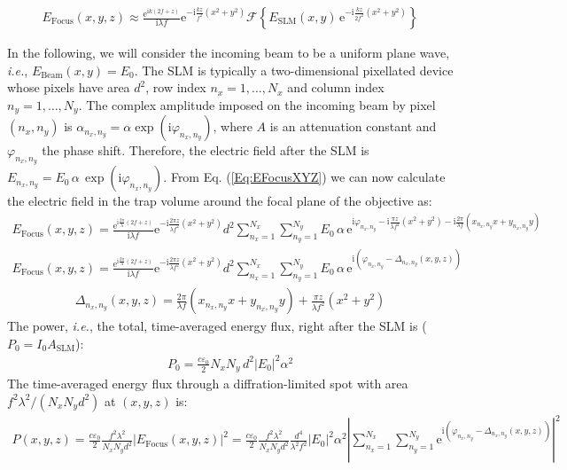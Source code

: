 \documentclass[a4paper,11pt,onecolumn]{scrartcl}
\renewcommand{\i}{\mathrm i}
\newcommand{\e}{\mathrm e}
\begin{document}
\begin{align}
\boxed{
E_\mathrm{Focus}(x,y,z) \approx \frac{\mathrm e^{\i k(2f + z)}}{\i\lambda f}\e^{-\i\frac{kz}{f^2}(x^2+y^2)}\mathcal F\left\{E_\mathrm{SLM}(x, y)\,\e^{-\i\frac{kz}{2f^2}(x^2 + y^2)}\right\}
}
\label{Eq:EFocusXYZ}
\end{align}

In the following, we will consider the incoming beam to be a uniform plane wave, \textit{i.e.}, $E_\mathrm{Beam}(x, y) = E_0$. The SLM is typically a two-dimensional pixellated device whose pixels have area $d^2$, row index $n_x = 1, \dots , N_x$ and column index $n_y = 1, \dots , N_y$. The complex amplitude imposed on the incoming beam by pixel $(n_x , n_y)$ is $\alpha_{n_x, n_y} = \alpha \exp(\i\varphi_{n_x ,n_y})$, where $A$ is an attenuation constant and $\varphi_{n_x ,n_y}$ the phase shift. Therefore, the electric field after the SLM is $E_{n_x, n_y} = E_0\, \alpha\,\exp(\i\varphi_{n_x ,n_y})$. From Eq. (\ref{Eq:EFocusXYZ}) we can now calculate the electric field in the trap volume around the focal plane of the objective as:
\begin{align}
E_\mathrm{Focus}(x,y,z) = \frac{\mathrm e^{\i \frac{2\pi}{\lambda}(2f + z)}}{\i\lambda f}\e^{-\i\frac{2\pi z}{\lambda f^2}(x^2+y^2)}d^2\sum_{n_x=1}^{N_x}\sum_{n_y=1}^{N_y} E_0\,\alpha\,\mathrm e^{\mathrm i \varphi_{n_x ,n_y} -\i\frac{\pi z}{\lambda f^2}(x^2 + y^2) -\i\frac{2\pi}{\lambda f}(x_{n_x,n_y} x + y_{n_x,n_y}y)}
\end{align}
\begin{align}
E_\mathrm{Focus}(x,y,z) = \frac{\mathrm e^{\i \frac{2\pi}{\lambda}(2f + z)}}{\i\lambda f}\e^{-\i\frac{2\pi z}{\lambda f^2}(x^2+y^2)}d^2\sum_{n_x=1}^{N_x}\sum_{n_y=1}^{N_y} E_0\,\alpha\,\mathrm e^{\i\left(\varphi_{n_x ,n_y} - \Delta_{n_x ,n_y}(x, y, z)\right)}
\end{align}
\begin{align}
\Delta_{n_x ,n_y}(x, y ,z) = \frac{2\pi}{\lambda f}(x_{n_x,n_y} x + y_{n_x,n_y}y) + \frac{\pi z}{\lambda f^2}(x^2 + y^2)
\end{align}
The power, \textit{i.e.}, the total, time-averaged energy flux, right after the SLM is ($P_0 = I_0 A_\mathrm{SLM}$):
\begin{align}
P_0 = \frac{c\varepsilon_0}{2}N_xN_y\,d^2\left|E_0\right|^2\alpha^2
\end{align}
The time-averaged energy flux through a diffration-limited spot with area $f^2\lambda^2/(N_xN_yd^2)$ at $(x,y,z)$ is:
\begin{align*}
P(x,y,z) = \frac{c\varepsilon_0}{2}\frac{f^2\lambda^2}{N_xN_yd^2} \left|E_\mathrm{Focus}(x,y,z)\right|^2 = \frac{c\varepsilon_0}{2}\frac{f^2\lambda^2}{N_xN_yd^2}\frac{d^4}{\lambda^2f^2}\left|E_0\right|^2\alpha^2\left|\sum_{n_x=1}^{N_x}\sum_{n_y=1}^{N_y} \mathrm e^{\i\left(\varphi_{n_x ,n_y} - \Delta_{n_x ,n_y}(x, y, z)\right)}\right|^2
\end{align*}
\end{document}
